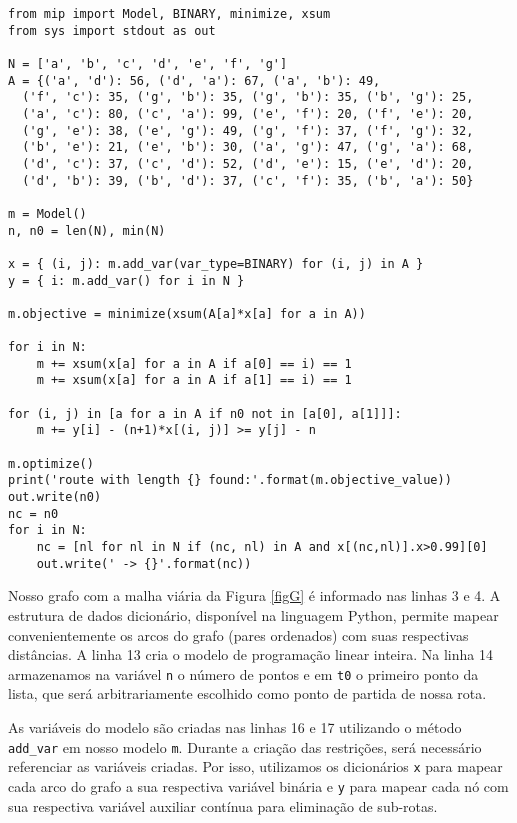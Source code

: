 \documentclass[a4paper,11pt,fleqn]{article}
\begin{document}
{\small
\begin{lstlisting}
from mip import Model, BINARY, minimize, xsum
from sys import stdout as out

N = ['a', 'b', 'c', 'd', 'e', 'f', 'g']
A = {('a', 'd'): 56, ('d', 'a'): 67, ('a', 'b'): 49, 
  ('f', 'c'): 35, ('g', 'b'): 35, ('g', 'b'): 35, ('b', 'g'): 25,
  ('a', 'c'): 80, ('c', 'a'): 99, ('e', 'f'): 20, ('f', 'e'): 20,
  ('g', 'e'): 38, ('e', 'g'): 49, ('g', 'f'): 37, ('f', 'g'): 32,
  ('b', 'e'): 21, ('e', 'b'): 30, ('a', 'g'): 47, ('g', 'a'): 68,
  ('d', 'c'): 37, ('c', 'd'): 52, ('d', 'e'): 15, ('e', 'd'): 20,
  ('d', 'b'): 39, ('b', 'd'): 37, ('c', 'f'): 35, ('b', 'a'): 50}
  
m = Model()
n, n0 = len(N), min(N)

x = { (i, j): m.add_var(var_type=BINARY) for (i, j) in A }
y = { i: m.add_var() for i in N }

m.objective = minimize(xsum(A[a]*x[a] for a in A))

for i in N:
    m += xsum(x[a] for a in A if a[0] == i) == 1
    m += xsum(x[a] for a in A if a[1] == i) == 1
	
for (i, j) in [a for a in A if n0 not in [a[0], a[1]]]:
    m += y[i] - (n+1)*x[(i, j)] >= y[j] - n
	
m.optimize()
print('route with length {} found:'.format(m.objective_value))
out.write(n0)
nc = n0
for i in N:
    nc = [nl for nl in N if (nc, nl) in A and x[(nc,nl)].x>0.99][0]
    out.write(' -> {}'.format(nc))
\end{lstlisting}
}

Nosso grafo com a malha viária da Figura \ref{figG} é informado nas linhas 3 e 4. A estrutura de dados dicionário, disponível na linguagem Python, permite mapear convenientemente os arcos do grafo (pares ordenados) com suas respectivas distâncias. A linha 13 cria o modelo de programação linear inteira. Na linha 14 armazenamos na variável \texttt{n} o número de pontos e em \texttt{t0} o primeiro ponto da lista, que será arbitrariamente escolhido como ponto de partida de nossa rota. 

As variáveis do modelo são criadas nas linhas 16 e 17 utilizando o método \texttt{add\_var} em nosso modelo \texttt{m}. Durante a criação das restrições, será necessário referenciar as variáveis criadas. Por isso, utilizamos os dicionários \texttt{x} para mapear cada arco do grafo a sua respectiva variável binária e \texttt{y} para mapear cada nó com sua respectiva variável auxiliar contínua para eliminação de sub-rotas.
\end{document}
